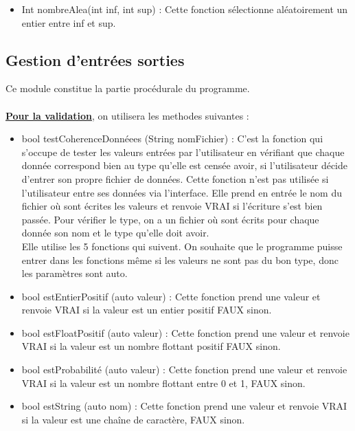\documentclass[a4paper,11pt]{article}
\begin{document}
\begin{itemize}
							\item Int nombreAlea(int inf, int sup) : Cette fonction sélectionne aléatoirement un entier entre inf et sup.

					\end{itemize}
		
		\subsection{Gestion d'entrées sorties}
			Ce module constitue la partie procédurale du programme.\\
			\\
			\underline{\bf Pour la validation}, on utilisera les methodes suivantes :\\
			\begin{itemize}
				\item bool testCoherenceDonnéees (String nomFichier) : C’est la fonction qui s’occupe de tester les valeurs entrées par l’utilisateur en vérifiant que chaque donnée correspond bien au type qu’elle est censée avoir, si l'utilisateur décide d'entrer son propre fichier de données. Cette fonction n'est pas utilisée si l'utilisateur entre ses données via l'interface.
					Elle prend en entrée le nom du fichier où sont écrites les valeurs et renvoie VRAI si l'écriture s'est bien passée.
					Pour vérifier le type, on a un fichier où sont écrits pour chaque donnée son nom et le type qu’elle doit avoir.\\
					Elle utilise les 5 fonctions qui suivent. On souhaite que le programme puisse entrer dans les fonctions même si les valeurs ne sont pas du bon type, donc les paramètres sont auto.\vspace{0.2cm}
				\item bool estEntierPositif (auto valeur) : Cette fonction prend une valeur et renvoie VRAI si la valeur est un entier positif FAUX sinon.\vspace{0.2cm}
				\item bool estFloatPositif (auto valeur) : Cette fonction prend une valeur et renvoie VRAI si la valeur est un nombre flottant positif FAUX sinon.\vspace{0.2cm}
				\item bool estProbabilité (auto valeur) : Cette fonction prend une valeur et renvoie VRAI si la valeur est un nombre flottant entre 0 et 1, FAUX sinon.\vspace{0.2cm}
				\item bool estString (auto nom) : 	Cette fonction prend une valeur et renvoie VRAI si la valeur est une chaîne de caractère, FAUX sinon.\vspace{0.2cm}

\end{itemize}
\end{document}
